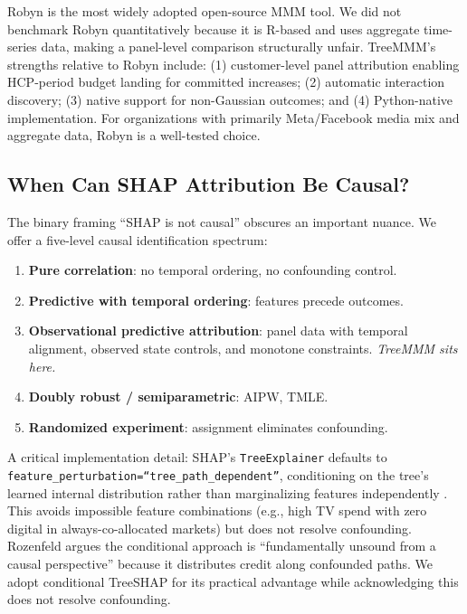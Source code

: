 \documentclass[review,12pt]{elsarticle}
\begin{document}
Robyn \cite{runge2024robyn} is the most widely adopted open-source MMM tool. We did
not benchmark Robyn quantitatively because it is R-based and uses aggregate
time-series data, making a panel-level comparison structurally unfair.
TreeMMM's strengths relative to Robyn include: (1) customer-level panel
attribution enabling HCP-period budget landing for committed increases;
(2) automatic interaction discovery; (3) native support for non-Gaussian
outcomes; and (4) Python-native implementation. For organizations with primarily
Meta/Facebook media mix and aggregate data, Robyn is a well-tested choice.

\subsection{When Can SHAP Attribution Be Causal?}
\label{sec:discussion:causal}

The binary framing ``SHAP is not causal'' obscures an important nuance.
We offer a five-level causal identification spectrum:
\begin{enumerate}
\item \textbf{Pure correlation}: no temporal ordering, no confounding control.
\item \textbf{Predictive with temporal ordering}: features precede outcomes.
\item \textbf{Observational predictive attribution}: panel data with temporal
  alignment, observed state controls, and monotone constraints. \emph{TreeMMM
  sits here.}
\item \textbf{Doubly robust / semiparametric}: AIPW, TMLE.
\item \textbf{Randomized experiment}: assignment eliminates confounding.
\end{enumerate}

A critical implementation detail: SHAP's \texttt{TreeExplainer} defaults to
\texttt{feature\_perturbation=``tree\_path\_dependent''}, conditioning on the
tree's learned internal distribution rather than marginalizing features
independently \cite{lundberg2020trees}. This avoids impossible feature
combinations (e.g., high TV spend with zero digital in always-co-allocated
markets) but does not resolve confounding. Rozenfeld \cite{rozenfeld2024causal}
argues the conditional approach is ``fundamentally unsound from a causal
perspective'' because it distributes credit along confounded paths. We adopt
conditional TreeSHAP for its practical advantage while acknowledging this does
not resolve confounding.
\end{document}
